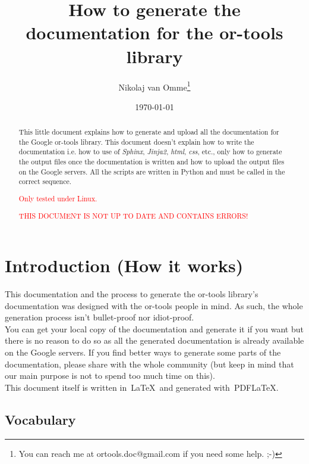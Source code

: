 \documentclass[a4paper,10pt]{article}
\title{How to generate the documentation for the or-tools library}
\author{Nikolaj van Omme\footnote{You can reach me at ortools.doc@gmail.com if you need some help. ;-) }}
\date{\today}
\begin{document}
\maketitle

\begin{abstract}
This little document explains how to generate and upload all the documentation for the Google or-tools library. This document doesn't explain how to write the documentation i.e. how to use of \emph{Sphinx}, \emph{Jinja2}, \emph{html}, \emph{css}, etc., only how to generate the output files once
the documentation is written and how to upload the output files on the Google servers. All the scripts are written in Python and must be called in the correct sequence.\\
\begin{center}\textcolor{red}{Only tested under Linux.}\end{center}
\begin{center}\textcolor{red}{THIS DOCUMENT IS NOT UP TO DATE AND CONTAINS ERRORS!}\end{center}
\end{abstract}

\setcounter{tocdepth}{2}
\tableofcontents

\section{Introduction (How it works)}

This documentation and the process to generate the or-tools library's documentation was designed with the or-tools people in mind. As such, the whole generation process isn't bullet-proof nor idiot-proof.\\

You can get your local copy of the documentation and generate it if you want but there is no reason to do so as all the generated documentation is already available on the Google servers. If you find better ways to generate some parts of the documentation, please share with the whole community (but keep in mind that our main purpose is not to spend too much time on this).\\

This document itself is written in~\LaTeX\ and generated with~PDF\LaTeX.

\subsection{Vocabulary}
\end{document}

